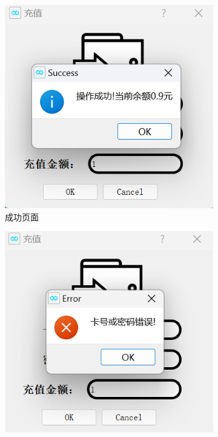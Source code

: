 \documentclass{article}
\begin{document}
    \begin{figure}[htbp]
        \centering
        \begin{subfigure}{0.24\linewidth}
            \centering
            \includegraphics[width=\linewidth]{figure/addmoney_success.png}
            \caption{成功页面}
            \label{addmoney_success}
        \end{subfigure}
        \centering
        \begin{subfigure}{0.24\linewidth}
            \centering
            \includegraphics[width=\linewidth]{figure/addmoney_id_password_error.png}

\end{subfigure}
\end{figure}
\end{document}
